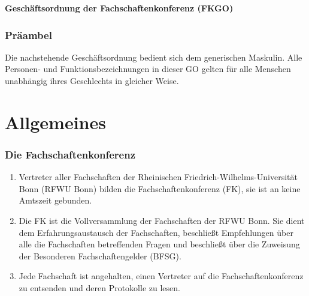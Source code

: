 \documentclass{article}
\begin{document}
\noindent
\begin{center}
    \huge \textbf{Geschäftsordnung der Fachschaftenkonferenz (FKGO)}
\end{center}

\section*{Präambel}
\noindent
Die nachstehende Geschäftsordnung bedient sich dem generischen Maskulin.
Alle Personen- und Funktionsbezeichnungen in dieser GO gelten für alle Menschen unabhängig ihres Geschlechts in gleicher Weise.

\part{Allgemeines}
\section{Die Fachschaftenkonferenz}
\begin{enumerate}[(1)]
    \item Vertreter aller Fachschaften der Rheinischen Friedrich-Wilhelms-Universität Bonn (RFWU Bonn) bilden die Fachschaftenkonferenz (FK), sie ist an keine Amtszeit gebunden.
    \item Die FK ist die Vollversammlung der Fachschaften der RFWU Bonn.
    	Sie dient dem Erfahrungsaustausch der Fachschaften, beschließt Empfehlungen über alle die Fachschaften betreffenden Fragen und beschließt über die Zuweisung der Besonderen Fachschaftengelder (BFSG).
    \item Jede Fachschaft ist angehalten, einen Vertreter auf die Fachschaftenkonferenz zu entsenden und deren Protokolle zu lesen.
\end{enumerate}
\end{document}
